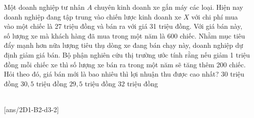 \begin{ex}
	Một doanh nghiệp tư nhân $A$ chuyên kinh doanh xe gắn máy các loại. Hiện nay doanh nghiệp đang tập trung vào chiến lược kinh doanh xe $X$ với chi phí mua vào một chiếc là 27 triệu đồng và bán ra với giá 31 triệu đồng. Với giá bán này, số lượng xe mà khách hàng đã mua trong một năm là 600 chiếc. Nhằm mục tiêu đẩy mạnh hơn nữa lượng tiêu thụ dòng xe đang bán chạy này, doanh nghiệp dự định giảm giá bán. Bộ phận nghiên cứu thị trường ước tính rằng nếu giảm 1 triệu đồng mỗi chiếc xe thì số lượng xe bán ra trong một năm sẽ tăng thêm 200 chiếc. Hỏi theo đó, giá bán mới là bao nhiêu thì lợi nhuận thu được cao nhất?
	\choice
	{$30$ triệu đồng}
	{\True $30,5$ triệu đồng}
	{$29,5$ triệu đồng}
	{$32$ triệu đồng}
\end{ex}

 \\
[ans/2D1-B2-d3-2]

